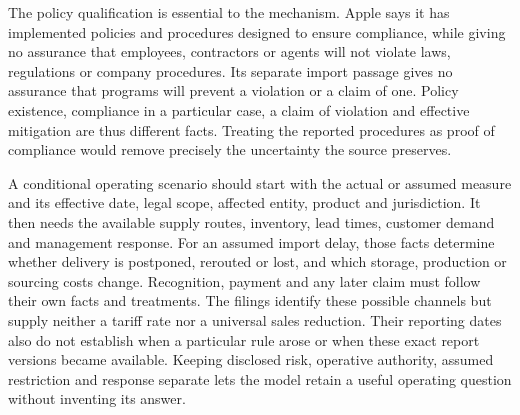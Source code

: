 The policy qualification is essential to the mechanism. Apple says it has
implemented policies and procedures designed to ensure compliance, while giving
no assurance that employees, contractors or agents will not violate laws,
regulations or company procedures. Its separate import passage gives no
assurance that programs will prevent a violation or a claim of one. Policy
existence, compliance in a particular case, a claim of violation and effective
mitigation are thus different facts. Treating the reported procedures as proof
of compliance would remove precisely the uncertainty the source preserves.

A conditional operating scenario should start with the actual or assumed
measure and its effective date, legal scope, affected entity, product and
jurisdiction. It then needs the available supply routes, inventory, lead times,
customer demand and management response. For an assumed import delay, those
facts determine whether delivery is postponed, rerouted or lost, and which
storage, production or sourcing costs change. Recognition, payment and any
later claim must follow their own facts and treatments. The filings identify
these possible channels but supply neither a tariff rate nor a universal sales
reduction. Their reporting dates also do not establish when a particular rule
arose or when these exact report versions became available. Keeping disclosed
risk, operative authority, assumed restriction and response separate lets the
model retain a useful operating question without inventing its answer.
